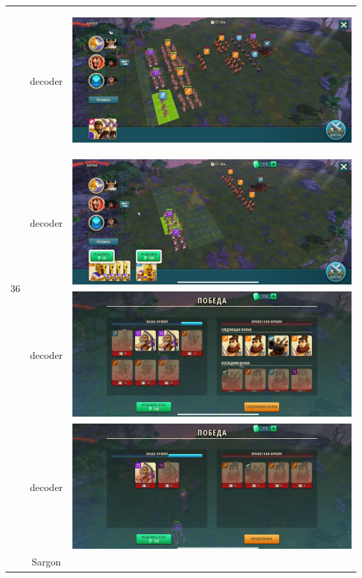 \begin{longtable}{|c|c|c|}
    \hline
    \multirow{8}{*}{36} & decoder &
    \hypertarget{fight36}{\includegraphics[width=0.75\linewidth]{./parts/media/TreasureHunt/36/decoder/photo_2022-04-07_10-07-13.jpg}} \\
    & decoder &
    \includegraphics[width=0.75\linewidth]{./parts/media/TreasureHunt/36/decoder/photo_2022-04-07_10-07-32.jpg} \\
    & decoder &
    \includegraphics[width=0.75\linewidth]{./parts/media/TreasureHunt/36/decoder/photo_2022-04-07_10-07-28.jpg} \\
    & decoder &
    \includegraphics[width=0.75\linewidth]{./parts/media/TreasureHunt/36/decoder/photo_2022-04-07_10-07-36.jpg} \\
    \hline
    \multirow{8}{*}{36} & Sargon &

\end{longtable}
